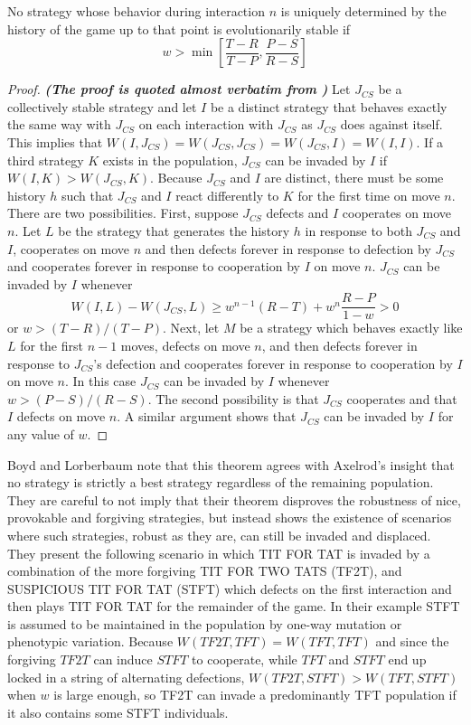 \begin{theorem}
No strategy whose behavior during interaction $n$ is uniquely determined by the history of the game up to that point is evolutionarily stable if
\[
w > \min \left[ \frac{T-R}{T-P}, \frac{P-S}{R-S} \right]
\]
\end{theorem}
\begin{proof}
\textit{\textbf{(The proof is quoted almost verbatim from \cite{Boyd_Lorberbaum_1987})}}
Let $J_{CS}$ be a collectively stable strategy and let $I$ be a distinct strategy that behaves exactly the same way with $J_{CS}$ on each interaction with $J_{CS}$ as $J_{CS}$ does against itself. This implies that $W(I, J_{CS}) = W (J_{CS}, J_{CS}) = W(J_{CS}, I) = W(I, I)$. If a third strategy $K$ exists in the population, $J_{CS}$ can be invaded by $I$ if $W(I, K) > W(J_{CS}, K)$. Because $J_{CS}$ and $I$ are distinct, there must be some history $h$ such that $J_{CS}$ and $I$ react differently to $K$ for the first time on move $n$. There are two possibilities. First, suppose $J_{CS}$ defects and $I$ cooperates on move $n$. Let $L$ be the strategy that generates the history $h$ in response to both $J_{CS}$ and $I$, cooperates on move $n$ and then defects forever in response to defection by $J_{CS}$ and cooperates forever in response to cooperation by $I$ on move $n$. $J_{CS}$ can be invaded by $I$ whenever
\[
W(I, L) - W(J_{CS}, L) \geq w^{n-1} (R-T) + w^n \frac{R- P}{1-w} > 0
\]
or $w > (T-R) / (T-P)$. Next, let $M$ be a strategy which behaves exactly like $L$ for the first $n-1$ moves, defects on move $n$, and then defects forever in response to $J_{CS}$'s defection and cooperates forever in response to cooperation by $I$ on move $n$. In this case $J_{CS}$ can be invaded by $I$ whenever $w > (P-S) / (R-S)$. The second possibility is that $J_{CS}$ cooperates and that $I$ defects on move $n$. A similar argument shows that $J_{CS}$ can be invaded by $I$ for any value of $w$.
\end{proof}

Boyd and Lorberbaum note that this theorem agrees with Axelrod's insight that no strategy is strictly a best strategy regardless of the remaining population. They are careful to not imply that their theorem disproves the robustness of nice, provokable and forgiving strategies, but instead shows the existence of scenarios where such strategies, robust as they are, can still be invaded and displaced. They present the following scenario in which TIT FOR TAT is invaded by a combination of the more forgiving TIT FOR TWO TATS (TF2T), and SUSPICIOUS TIT FOR TAT (STFT) which defects on the first interaction and then plays TIT FOR TAT for the remainder of the game. In their example STFT is assumed to be maintained in the population by one-way mutation or phenotypic variation. Because $W(TF2T, TFT) = W(TFT, TFT)$ and since the forgiving $TF2T$ can induce $STFT$ to cooperate, while $TFT$ and $STFT$ end up locked in a string of alternating defections, $W(TF2T, STFT) > W(TFT, STFT)$ when $w$ is large enough, so TF2T can invade a predominantly TFT population if it also contains some STFT individuals.

